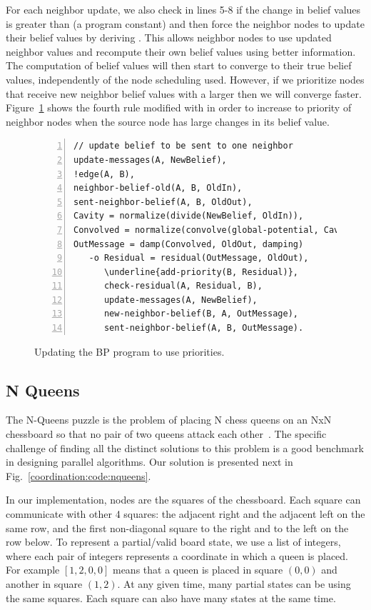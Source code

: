 For each neighbor update, we also check in lines 5-8 if the change in belief
values is greater than  (a program constant) and then force the
neighbor nodes to update their belief values by deriving .
This allows neighbor nodes to use updated neighbor values and recompute their
own belief values using better information. The computation of belief values
will then start to converge to their true belief values, independently of the
node scheduling used. However, if we prioritize nodes that receive new neighbor
belief values with a larger  then we will converge faster.
Figure~\ref{code:coordination:improved_bp} shows the fourth rule modified with
 in order to increase to priority of neighbor nodes when
the source node has large changes in its belief value.

\begin{figure}[h!]
\begin{Verbatim}[numbers=left,commandchars=\\\{\},fontsize=\scriptsize]
// update belief to be sent to one neighbor
update-messages(A, NewBelief),
!edge(A, B),
neighbor-belief-old(A, B, OldIn),
sent-neighbor-belief(A, B, OldOut),
Cavity = normalize(divide(NewBelief, OldIn)),
Convolved = normalize(convolve(global-potential, Cavity)),
OutMessage = damp(Convolved, OldOut, damping)
   -o Residual = residual(OutMessage, OldOut),
      \underline{add-priority(B, Residual)},
      check-residual(A, Residual, B),
      update-messages(A, NewBelief),
      new-neighbor-belief(B, A, OutMessage),
      sent-neighbor-belief(A, B, OutMessage).
\end{Verbatim}
\caption{Updating the BP program to use priorities.}
\label{code:coordination:improved_bp}
\end{figure}

\subsection{N Queens}

The N-Queens puzzle is the problem of placing N chess queens on an NxN
chessboard so that no pair of two queens attack each
other~\cite{8queens}. The specific challenge of finding all the
distinct solutions to this problem is a good benchmark in designing
parallel algorithms.  Our solution is presented next in
Fig.~\ref{coordination:code:nqueens}.

In our implementation, nodes are the squares of the chessboard. Each
square can communicate with other 4 squares: the adjacent right and
the adjacent left on the same row, and the first non-diagonal square
to the right and to the left on the row below. To represent a
partial/valid board state, we use a list of integers, where each pair
of integers represents a coordinate in which a queen is placed. For
example $[1, 2, 0, 0]$ means that a queen is placed in square $(0, 0)$
and another in square $(1, 2)$. At any given time, many partial states
can be using the same squares. Each square can also have many states
at the same time.

